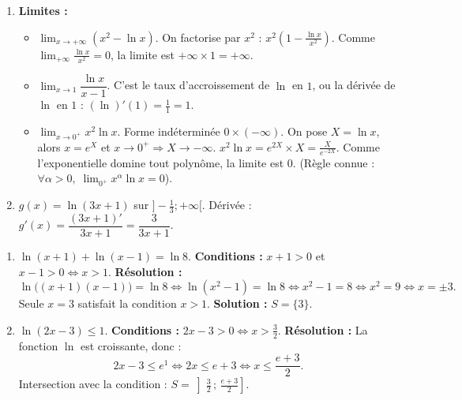 \documentclass[11pt]{article}
\begin{document}
\begin{corrige}
\begin{enumerate}
    \item \textbf{Limites :}
    \begin{itemize}
        \item $\displaystyle\lim_{x\to +\infty} (x^2 - \ln x)$.
        On factorise par $x^2$ : $x^2\left(1 - \frac{\ln x}{x^2}\right)$. Comme $\lim_{+\infty} \frac{\ln x}{x^2} = 0$, la limite est $+\infty \times 1 = +\infty$.
        \item $\displaystyle\lim_{x\to 1} \dfrac{\ln x}{x-1}$.
        C'est le taux d'accroissement de $\ln$ en $1$, ou la dérivée de $\ln$ en $1$ : $(\ln)'(1) = \frac{1}{1} = 1$.
        \item $\displaystyle\lim_{x\to 0^+} x^2 \ln x$.
        Forme indéterminée $0 \times (-\infty)$. On pose $X = \ln x$, alors $x = e^X$ et $x\to 0^+ \Rightarrow X\to -\infty$.
        $x^2 \ln x = e^{2X} \times X = \frac{X}{e^{-2X}}$. Comme l'exponentielle domine tout polynôme, la limite est $0$.
        (Règle connue : $\forall \alpha>0,\; \lim_{0^+} x^\alpha \ln x = 0$).
    \end{itemize}
    \item $g(x) = \ln(3x+1)$ sur $]-\frac{1}{3};+\infty[$.
    Dérivée : $g'(x) = \dfrac{(3x+1)'}{3x+1} = \dfrac{3}{3x+1}$.
\end{enumerate}
\end{corrige}

\begin{corrige}
\begin{enumerate}
    \item $\ln(x+1) + \ln(x-1) = \ln 8$.
    \textbf{Conditions :} $x+1>0$ et $x-1>0 \iff x>1$.
    \textbf{Résolution :}
    \[
    \ln\big((x+1)(x-1)\big) = \ln 8 \iff \ln(x^2-1) = \ln 8 \iff x^2-1 = 8 \iff x^2 = 9 \iff x = \pm 3.
    \]
    Seule $x=3$ satisfait la condition $x>1$.
    \textbf{Solution :} $S = \{3\}$.
    \item $\ln(2x-3) \le 1$.
    \textbf{Conditions :} $2x-3 > 0 \iff x > \frac{3}{2}$.
    \textbf{Résolution :} La fonction $\ln$ est croissante, donc :
    \[
    2x-3 \le e^1 \iff 2x \le e+3 \iff x \le \frac{e+3}{2}.
    \]
    Intersection avec la condition : $S = \left]\frac{3}{2}\,;\,\frac{e+3}{2}\right]$.
\end{enumerate}
\end{corrige}
\end{document}
